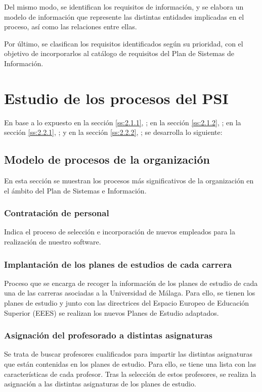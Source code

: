 \documentclass[11pt,a4paper,spanish,twoside]{book}
\begin{document}
Del mismo modo, se identifican los requisitos de información, y
se elabora un modelo de información que represente las distintas entidades
implicadas en el proceso, así como las relaciones entre ellas. 

Por último, se clasifican los requisitos identificados según su prioridad,
con el objetivo de incorporarlos al catálogo de requisitos del Plan de
Sistemas de Información. 

\section{Estudio de los procesos del PSI}
En base a lo expuesto 
en la sección \vref{ss:2.1.1}, \emph{}; 
en la sección \vref{ss:2.1.2}, \emph{}; 
en la sección \vref{ss:2.2.1}, \emph{}; y
en la sección \vref{ss:2.2.2}, \emph{}; 
se desarrolla lo siguiente:

\subsection{Modelo de procesos de la organización} \label{ss:4.1.1}
En esta sección se muestran los procesos más significativos de la
organización en el ámbito del Plan de Sistemas e Información.  

\subsubsection{Contratación de personal}
Indica el proceso de selección e incorporación de nuevos empleados para la
realización de nuestro software.

\subsubsection{Implantación de los planes de estudios de cada carrera}
Proceso que se encarga de recoger la información de los planes de estudio de
cada una de las carreras asociadas a la Universidad de Málaga. Para ello, se
tienen los planes de estudio y junto con las directrices del Espacio Europeo
de Educación Superior (EEES) se realizan los nuevos Planes de Estudio
adaptados.

\subsubsection{Asignación del profesorado a distintas asignaturas}
Se trata de buscar profesores cualificados para impartir las distintas
asignaturas que están contenidas en los planes de estudio. Para ello, se
tiene una lista con las características de cada profesor. Tras la selección
de estos profesores, se realiza la asignación a las distintas asignaturas de
los planes de estudio.
 
\end{document}
